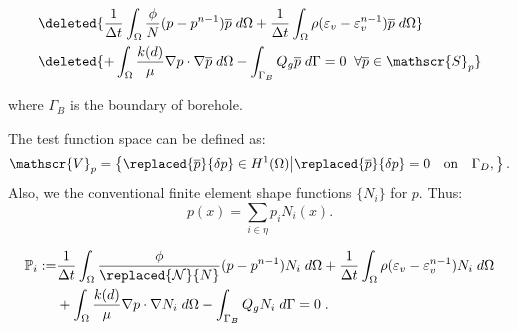 \begin{equation}\label{Eq:weak_pressure}
\begin{aligned}
        &\deleted{ \frac{1}{\Delta t} \int_{\Omega} \frac{\phi}{{N}}(p-p^{n-1}) {\overline{p}} \; d\Omega + \dfrac{1}{{\Delta t}}\int_{\Omega} \rho(\varepsilon_v-\varepsilon_v^{n-1}) {\overline{p}} \; d\Omega} \\& \deleted{+ \int_{\Omega} \frac{k(d)}{\mu} \nabla p \cdot \nabla {\overline{p}} \; d\Omega   
         -\int_{\Gamma_B} Q_g {\overline{p}} \; d\Gamma =0 \; \;\forall {\overline{p}} \in\mathscr{S}_p}
\end{aligned}
\end{equation}

where $\Gamma_B$ is the boundary of borehole.

The test function space can be defined as:
\begin{equation*}
         \mathscr{V}_{p}= \left \{\replaced{\overline{p}}{\delta p}\in H^1(\Omega) \middle | \replaced{\overline{p}}{\delta p} =0 \quad \text{on} \quad \Gamma_D, \right \}.
\end{equation*}
Also, we   the conventional finite element shape functions $\{N_i\}$ for $p$. Thus:
\begin{equation}\label{Eq:p_discretized}
    p(x)=\sum_{i\in\eta} p_i N_i(x).
\end{equation}

\begin{equation}\label{Eq:flow_weak}
\begin{aligned}
      \mathbb{P}_i := & \frac{1}{\Delta t} \int_{\Omega} \frac{\phi}{\replaced{\mathcal{N}}{N}} (p-p^{n-1}) N_i  \; d\Omega + \dfrac{1}{{\Delta t}}\int_{\Omega}  \rho(\varepsilon_v-\varepsilon_v^{n-1}) N_i \; d\Omega \\& +  \int_{\Omega} \frac{k(d)}{\mu} \nabla p \cdot \nabla N_i \; d\Omega   
         -\int_{\Gamma_B}  Q_g N_i \; d\Gamma =0 \;.
\end{aligned}
\end{equation}
